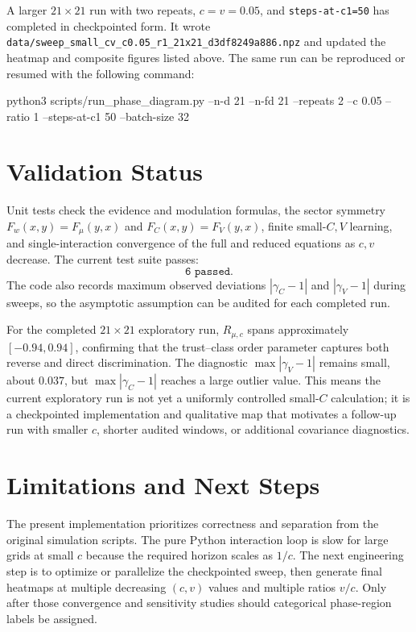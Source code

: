 \documentclass{article}
\newcommand{\Rmc}{R_{\mu,c}}
\begin{document}
A larger $21\times21$ run with two repeats, $c=v=0.05$, and
\texttt{steps-at-c1=50} has completed in checkpointed form.  It wrote
\texttt{data/sweep\_small\_cv\_c0.05\_r1\_21x21\_d3df8249a886.npz} and updated
the heatmap and composite figures listed above.  The same run can be reproduced
or resumed with the following command:
\begin{center}
\begin{minipage}{0.96\linewidth}
{\small\ttfamily
python3 scripts/run\_phase\_diagram.py --n-d 21 --n-fd 21 --repeats 2
--c 0.05 --ratio 1 --steps-at-c1 50 --batch-size 32}
\end{minipage}
\end{center}

\section{Validation Status}

Unit tests check the evidence and modulation formulas, the sector symmetry
$F_w(x,y)=F_\mu(y,x)$ and $F_C(x,y)=F_V(y,x)$, finite small-$C,V$ learning, and
single-interaction convergence of the full and reduced equations as $c,v$
decrease.  The current test suite passes:
\[
  \texttt{6 passed}.
\]
The code also records maximum observed deviations
$|\gamma_C-1|$ and $|\gamma_V-1|$ during sweeps, so the asymptotic assumption can
be audited for each completed run.

For the completed $21\times21$ exploratory run, $\Rmc$ spans approximately
$[-0.94,0.94]$, confirming that the trust--class order parameter captures both
reverse and direct discrimination.  The diagnostic
$\max|\gamma_V-1|$ remains small, about $0.037$, but
$\max|\gamma_C-1|$ reaches a large outlier value.  This means the current
exploratory run is not yet a uniformly controlled small-$C$ calculation; it is a
checkpointed implementation and qualitative map that motivates a follow-up run
with smaller $c$, shorter audited windows, or additional covariance diagnostics.

\section{Limitations and Next Steps}

The present implementation prioritizes correctness and separation from the
original simulation scripts.  The pure Python interaction loop is slow for
large grids at small $c$ because the required horizon scales as $1/c$.  The next
engineering step is to optimize or parallelize the checkpointed sweep, then
generate final heatmaps at multiple decreasing $(c,v)$ values and multiple
ratios $v/c$.  Only after those convergence and sensitivity studies should
categorical phase-region labels be assigned.
\end{document}
